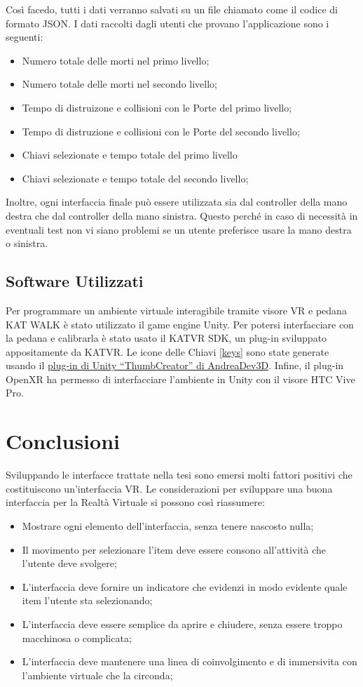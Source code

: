 \documentclass[target=bach,aauheader=]{thud}
\begin{document}
Così facedo, tutti i dati verranno salvati su un file chiamato come il codice di formato JSON.
I dati raccolti dagli utenti che provano l'applicazione sono i seguenti:
\begin{itemize}
    \item Numero totale delle morti nel primo livello;
    \item Numero totale delle morti nel secondo livello;
    \item Tempo di distruizone e collisioni con le Porte del primo livello;
    \item Tempo di distruzione e collisioni con le Porte del secondo livello;
    \item Chiavi selezionate e tempo totale del primo livello
    \item Chiavi selezionate e tempo totale del secondo livello;
\end{itemize}

Inoltre, ogni interfaccia finale può essere utilizzata sia dal controller della mano destra che dal controller della mano sinistra.
Questo perché in caso di necessità in eventuali test non vi siano problemi se un utente preferisce usare la mano destra o sinistra.

\section{Software Utilizzati}
Per programmare un ambiente virtuale interagibile tramite visore VR e pedana KAT WALK è stato utilizzato il game engine Unity.
Per potersi interfacciare con la pedana e calibrarla è stato usato il KATVR SDK, un plug-in sviluppato appositamente da KATVR.
Le icone delle Chiavi \ref{keys} sono state generate usando il \href{https://github.com/AndreaDev3D/ThumbCreator}{plug-in di Unity “ThumbCreator” di AndreaDev3D}.
Infine, il plug-in OpenXR ha permesso di interfacciare l'ambiente in Unity con il visore HTC Vive Pro.


\chapter{Conclusioni} %
Sviluppando le interfacce trattate nella tesi sono emersi molti fattori positivi che costituiscono un'interfaccia VR.
Le considerazioni per sviluppare una buona interfaccia per la Realtà Virtuale si possono così riassumere:
\begin{itemize}
    \item Mostrare ogni elemento dell'interfaccia, senza tenere nascosto nulla;
    \item Il movimento per selezionare l'item deve essere consono all'attività che l'utente deve svolgere;
    \item L'interfaccia deve fornire un indicatore che evidenzi in modo evidente quale item l'utente sta selezionando;
    \item L'interfaccia deve essere semplice da aprire e chiudere, senza essere troppo macchinosa o complicata;
    \item L'interfaccia deve mantenere una linea di coinvolgimento e di immersivita con l'ambiente virtuale che la circonda; \\
\end{itemize}
\end{document}
